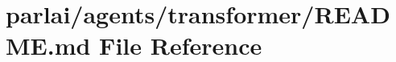 \hypertarget{parlai_2agents_2transformer_2README_8md}{}\section{parlai/agents/transformer/\+R\+E\+A\+D\+ME.md File Reference}
\label{parlai_2agents_2transformer_2README_8md}
